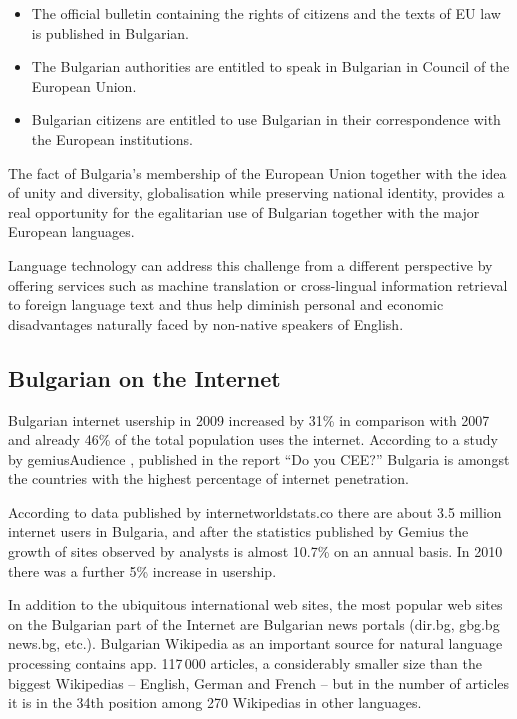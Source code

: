 \begin{multicols}{2}
  \begin{itemize}
  \item The official bulletin containing the rights of citizens and the texts of EU law is published in Bulgarian.
  \item The Bulgarian authorities are entitled to speak in Bulgarian in Council of the European Union.
  \item Bulgarian citizens are entitled to use Bulgarian in their correspondence with the European institutions.
  \end{itemize}

  The fact of Bulgaria’s membership of the European Union together with the idea of unity and diversity, globalisation while preserving national identity, provides a real opportunity for the egalitarian use of Bulgarian together with the major European languages.

  Language technology can address this challenge from a different perspective by offering services such as machine translation or cross-lingual information retrieval to foreign language text and thus help diminish personal and economic disadvantages naturally faced by non-native speakers of English.


  \subsection{Bulgarian on the Internet}

  Bulgarian internet usership in 2009 increased by 31\% in comparison with 2007 and already 46\% of the total population uses the internet. According to a study by gemiusAudience \cite{gemius}, published in the report ``Do you CEE?'' \cite{inetcee} Bulgaria is amongst the countries with the highest percentage of internet penetration.

  According to data published by internetworldstats.co \cite{inetworldstat} there are about 3.5 million internet users in Bulgaria, and after the statistics published by Gemius the growth of sites observed by analysts is almost 10.7\% on an annual basis. In 2010 there was a further 5\% increase in usership.

  In addition to the ubiquitous international web sites, the most popular web sites on the Bulgarian part of the Internet are Bulgarian news portals (dir.bg, gbg.bg news.bg, etc.). Bulgarian Wikipedia as an important source for natural language processing contains app. 117\,000 articles, a considerably smaller size than the biggest Wikipedias – English, German and French – but in the number of articles it is in the 34th position \cite{metadata} among 270 Wikipedias in other languages. 


\end{multicols}
